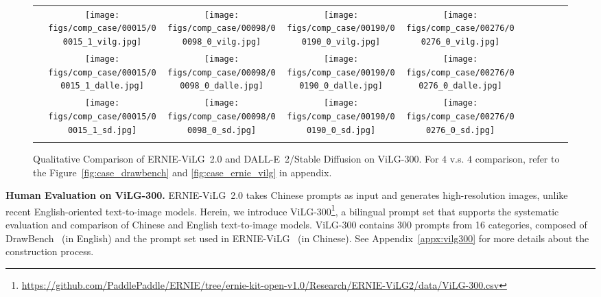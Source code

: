 \documentclass[10pt,twocolumn,letterpaper]{article}
\begin{document}
\begin{CJK*}{UTF8}{gbsn}
\begin{figure}[t]
    \centering
    \setlength{\tabcolsep}{2pt}
    \begin{tabular}{cccccccccc}
         &
        \texttt{[image: figs/comp\_case/00015/00015\_1\_vilg.jpg]} &
        \texttt{[image: figs/comp\_case/00098/00098\_0\_vilg.jpg]} &
        \texttt{[image: figs/comp\_case/00190/00190\_0\_vilg.jpg]} &
        \texttt{[image: figs/comp\_case/00276/00276\_0\_vilg.jpg]}
        \\
         &
        \texttt{[image: figs/comp\_case/00015/00015\_1\_dalle.jpg]} &
        \texttt{[image: figs/comp\_case/00098/00098\_0\_dalle.jpg]} &
        \texttt{[image: figs/comp\_case/00190/00190\_0\_dalle.jpg]} &
        \texttt{[image: figs/comp\_case/00276/00276\_0\_dalle.jpg]}
        \\
         &
        \texttt{[image: figs/comp\_case/00015/00015\_1\_sd.jpg]} &
        \texttt{[image: figs/comp\_case/00098/00098\_0\_sd.jpg]} &
        \texttt{[image: figs/comp\_case/00190/00190\_0\_sd.jpg]} &
        \texttt{[image: figs/comp\_case/00276/00276\_0\_sd.jpg]}
        \\
        & 
        &
    \end{tabular}
    \caption{Qualitative Comparison of ERNIE-ViLG~2.0 and DALL-E~2/Stable Diffusion on ViLG-300. For $4$ v.s. $4$ comparison, refer to the Figure~\ref{fig:case_drawbench} and \ref{fig:case_ernie_vilg} in appendix.}
    \label{fig:main_case}
\end{figure}
\end{CJK*}

 
\noindent\textbf{Human Evaluation on ViLG-300.}
ERNIE-ViLG~2.0 takes Chinese prompts as input and generates high-resolution images, unlike recent English-oriented text-to-image models.
Herein, we introduce ViLG-300\footnote{\url{https://github.com/PaddlePaddle/ERNIE/tree/ernie-kit-open-v1.0/Research/ERNIE-ViLG2/data/ViLG-300.csv}}, a bilingual prompt set that supports the systematic evaluation and comparison of Chinese and English text-to-image models.
ViLG-300 contains 300 prompts from 16 categories, composed of DrawBench~\cite{DBLP:journals/corr/abs-2205-11487} (in English) and the prompt set used in ERNIE-ViLG~\cite{DBLP:journals/corr/abs-2112-15283} (in Chinese). 
See Appendix~\ref{appx:vilg300} for more details about the construction process. 
\end{document}
